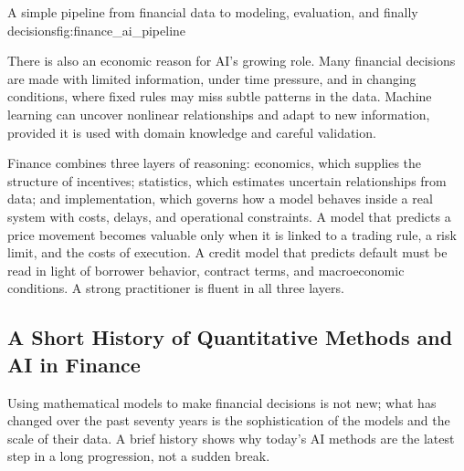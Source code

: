\documentclass[../ai_in_finance]{subfiles}
\begin{document}
\begin{bookfigure}[htbp]{A simple pipeline from financial data to modeling, evaluation, and finally decisions}{fig:finance_ai_pipeline}
\end{bookfigure}

There is also an economic reason for AI's growing role. Many financial decisions are made with limited information, under time pressure, and in changing conditions, where fixed rules may miss subtle patterns in the data. Machine learning can uncover nonlinear relationships and adapt to new information, provided it is used with domain knowledge and careful validation.

Finance combines three layers of reasoning: economics, which supplies the structure of incentives; statistics, which estimates uncertain relationships from data; and implementation, which governs how a model behaves inside a real system with costs, delays, and operational constraints. A model that predicts a price movement becomes valuable only when it is linked to a trading rule, a risk limit, and the costs of execution. A credit model that predicts default must be read in light of borrower behavior, contract terms, and macroeconomic conditions. A strong practitioner is fluent in all three layers.

\subsection{A Short History of Quantitative Methods and AI in Finance}
\label{sec:intro-history}

Using mathematical models to make financial decisions is not new; what has changed over the past seventy years is the sophistication of the models and the scale of their data. A brief history shows why today's AI methods are the latest step in a long progression, not a sudden break.
\end{document}
